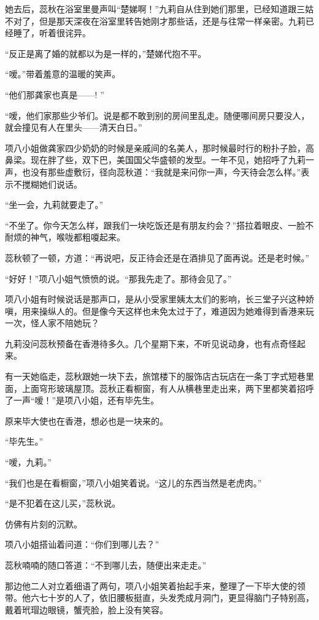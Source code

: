 \par 她去后，蕊秋在浴室里曼声叫“楚娣啊！”九莉自从住到她们那里，已经知道跟三姑不对了，但是那天深夜在浴室里转告她刚才那些话，还是与往常一样亲密。九莉已经睡了，听着很诧异。
\par “反正是离了婚的就都以为是一样的，”楚娣代抱不平。
\par “嗳。”带着羞意的温暖的笑声。
\par “他们那龚家也真是——! ”
\par “嗳，他们家那些少爷们。说是都不敢到别的房间里乱走。随便哪间房只要没人，就会撞见有人在里头——清天白日。”
\par 项八小姐做龚家四少奶奶的时候是亲戚间的名美人，那时候最时行的粉扑子脸，高鼻梁。现在胖了些，双下巴，美国国父华盛顿的发型。一年不见，她招呼了九莉一声，也没有那些虚敷衍，径向蕊秋道：“我就是来问你一声，今天待会怎么样。”表示不搅糊她们说话。
\par “坐一会，九莉就要走了。”
\par “不坐了。你今天怎么样，跟我们一块吃饭还是有朋友约会？”搭拉着眼皮、一脸不耐烦的神气，喉咙都粗嗄起来。
\par 蕊秋顿了一顿，方道：“再说吧，反正待会还是在酒排见了面再说。还是老时候。”
\par “好好！”项八小姐气愤愤的说。“那我先走了。那待会见了。”
\par 项八小姐有时候说话是那声口，是从小受家里姨太太们的影响，长三堂子兴这种娇嗔，用来操纵人的。但是像今天这样也未免太过于了，难道因为她难得到香港来玩一次，怪人家不陪她玩？
\par 九莉没问蕊秋预备在香港待多久。几个星期下来，不听见说动身，也有点奇怪起来。
\par 有一天她临走，蕊秋跟她一块下去，旅馆楼下的服饰店古玩店在一条丁字式短巷里面，上面穹形玻璃屋顶。蕊秋正看橱窗，有人从横巷里走出来，两下里都笑着招呼了一声“嗳！”是项八小姐，还有毕先生。
\par 原来毕大使也在香港，想必也是一块来的。
\par “毕先生。”
\par “嗳，九莉。”
\par “我们也是在看橱窗，”项八小姐笑着说。“这儿的东西当然是老虎肉。”
\par “是不犯着在这儿买，”蕊秋说。
\par 仿佛有片刻的沉默。
\par 项八小姐搭讪着问道：“你们到哪儿去？”
\par 蕊秋喃喃的随口答道：“不到哪儿去，随便出来走走。”
\par 那边他二人对立着细语了两句，项八小姐笑着抬起手来，整理了一下毕大使的领带。他六七十岁的人了，依旧腰板挺直，头发秃成月洞门，更显得脑门子特别高，戴着玳瑁边眼镜，蟹壳脸，脸上没有笑容。
